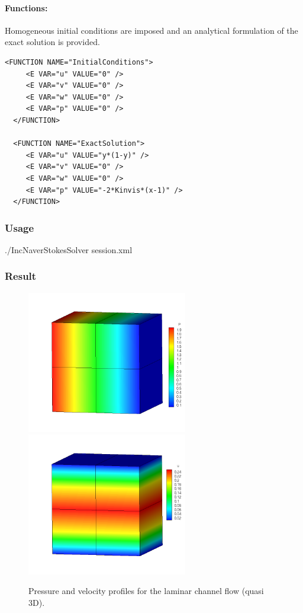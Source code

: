 \paragraph{Functions:~} Homogeneous initial conditions are imposed and an analytical formulation of the exact solution is provided.
\begin{lstlisting}[style=XMLStyle]
  <FUNCTION NAME="InitialConditions">
     <E VAR="u" VALUE="0" />
     <E VAR="v" VALUE="0" />
     <E VAR="w" VALUE="0" />
     <E VAR="p" VALUE="0" />
  </FUNCTION>

  <FUNCTION NAME="ExactSolution">
     <E VAR="u" VALUE="y*(1-y)" />
     <E VAR="v" VALUE="0" />
     <E VAR="w" VALUE="0" />
     <E VAR="p" VALUE="-2*Kinvis*(x-1)" />
  </FUNCTION>
\end{lstlisting}

\subsubsection{Usage}
./IncNaverStokesSolver session.xml

\subsubsection{Result}
\begin{figure}
\begin{center}
\includegraphics[width=7cm]{Figures/CF3DCVP3PR.png}
\includegraphics[width=7cm]{Figures/CF3DCVP3.png}
\caption{Pressure and velocity profiles for the laminar channel flow (quasi 3D).}
\end{center}
\end{figure}

